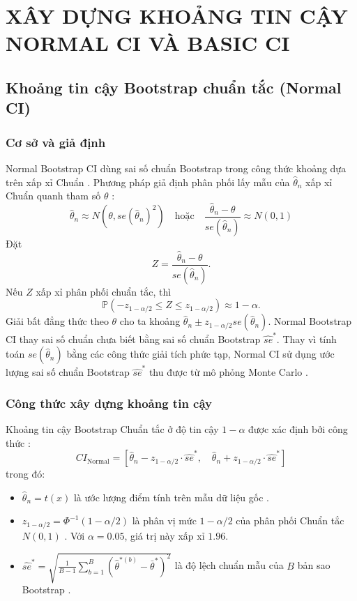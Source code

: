 	\section{XÂY DỰNG KHOẢNG TIN CẬY NORMAL CI VÀ BASIC CI}
	
	\subsection{Khoảng tin cậy Bootstrap chuẩn tắc (Normal CI)}
	
	\subsubsection{Cơ sở và giả định}
	Normal Bootstrap CI dùng sai số chuẩn Bootstrap trong công thức khoảng dựa trên xấp xỉ Chuẩn \cite{buithuytrang2026}. Phương pháp giả định phân phối lấy mẫu của $\hat{\theta}_n$ xấp xỉ Chuẩn quanh tham số $\theta$ \cite{efron1993}:
	\begin{equation}
		\hat{\theta}_n \approx N\left(\theta, se(\hat{\theta}_n)^2\right) \quad \text{hoặc} \quad \frac{\hat{\theta}_n - \theta}{se(\hat{\theta}_n)} \approx N(0, 1)
	\end{equation}
	Đặt
	\[
	Z=\frac{\hat{\theta}_n-\theta}{se(\hat{\theta}_n)}.
	\]
	Nếu $Z$ xấp xỉ phân phối chuẩn tắc, thì
	\[
	\mathbb{P}\left(
	-z_{1-\alpha/2}\leq Z\leq z_{1-\alpha/2}
	\right)\approx 1-\alpha.
	\]
	Giải bất đẳng thức theo $\theta$ cho ta khoảng
	$\hat{\theta}_n\pm z_{1-\alpha/2}se(\hat{\theta}_n)$. Normal Bootstrap CI
	thay sai số chuẩn chưa biết bằng sai số chuẩn Bootstrap $\widehat{se}^*$.
	Thay vì tính toán $se(\hat{\theta}_n)$ bằng các công thức giải tích phức tạp, Normal CI sử dụng ước lượng sai số chuẩn Bootstrap $\widehat{se}^*$ thu được từ mô phỏng Monte Carlo \cite{efron1993}.
	
	\subsubsection{Công thức xây dựng khoảng tin cậy}
	Khoảng tin cậy Bootstrap Chuẩn tắc ở độ tin cậy $1 - \alpha$ được xác định bởi công thức \cite{buithuytrang2026}:
	\begin{equation}
		CI_{\text{Normal}} = \left[ \hat{\theta}_n - z_{1-\alpha/2} \cdot \widehat{se}^*, \quad \hat{\theta}_n + z_{1-\alpha/2} \cdot \widehat{se}^* \right]
	\end{equation}
	trong đó:
	\begin{itemize}
		\item $\hat{\theta}_n = t(x)$ là ước lượng điểm tính trên mẫu dữ liệu gốc \cite{buithuytrang2026}.
		\item $z_{1-\alpha/2} = \Phi^{-1}(1 - \alpha/2)$ là phân vị mức $1-\alpha/2$ của phân phối Chuẩn tắc $N(0,1)$ \cite{buithuytrang2026}. Với $\alpha=0.05$, giá trị này xấp xỉ $1.96$.
		\item $\widehat{se}^* = \sqrt{\frac{1}{B-1}\sum_{b=1}^{B} \left(\hat{\theta}^{*(b)} - \bar{\theta}^*\right)^2}$ là độ lệch chuẩn mẫu của $B$ bản sao Bootstrap \cite{buithuytrang2026}.
	\end{itemize}
	
